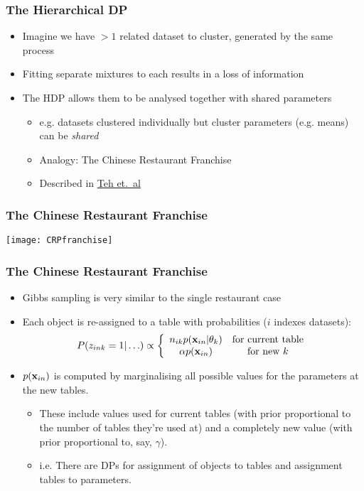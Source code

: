 
\begin{frame}
	\frametitle{The Hierarchical DP}
	\begin{itemize}
		\item Imagine we have $>1$ related dataset to cluster, generated by the same process
		\item Fitting separate mixtures to each results in a loss of information
		\item The \ac{HDP} allows them to be analysed together with shared parameters
		\begin{itemize}
			\item e.g. datasets clustered individually but cluster parameters (e.g. means) can be \emph{shared}
			\item Analogy: The Chinese Restaurant Franchise
			\item Described in \href{http://www.cs.berkeley.edu/~jordan/papers/hdp.pdf}{Teh et.~al}
		\end{itemize}
	\end{itemize}
\end{frame}

\begin{frame}
	\frametitle{The Chinese Restaurant Franchise}
	\texttt{[image: CRPfranchise]}
\end{frame}

\begin{frame}
	\frametitle{The Chinese Restaurant Franchise}
	\begin{itemize}
		\item Gibbs sampling is very similar to the single restaurant case
		\item Each object is re-assigned to a table with probabilities ($i$ indexes datasets):
		\[
			P(z_{ink} = 1|\ldots)\propto \left\{
			\begin{array}{cc}
				n_{ik}p(\mathbf{x}_{in}|\theta_k) & \mbox{for current table}\\
				\alpha p(\mathbf{x}_{in}) & \mbox{for new $k$}
			\end{array}
			\right.			
		\]
		\item $p(\mathbf{x}_{in})$ is computed by marginalising all possible values for the parameters at the new tables.
		\begin{itemize}
			\item These include values used for current tables (with prior proportional to the number of tables they're used at) and a completely new value (with prior proportional to, say, $\gamma$).
			\item i.e. There are \ac{DP}s for assignment of objects to tables and assignment tables to parameters.
		\end{itemize}
	\end{itemize}
\end{frame}

